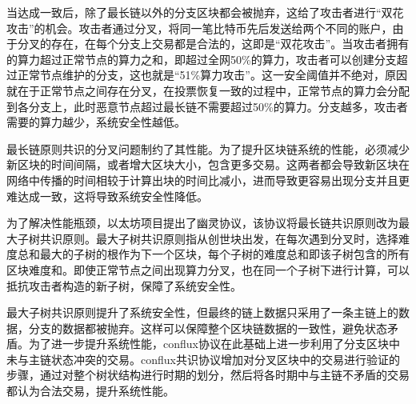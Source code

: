 当达成一致后，除了最长链以外的分支区块都会被抛弃，这给了攻击者进行“双花攻击”的机会。攻击者通过分叉，将同一笔比特币先后发送给两个不同的账户，由于分叉的存在，在每个分支上交易都是合法的，这即是“双花攻击”。当攻击者拥有的算力超过正常节点的算力之和，即超过全网50\%的算力，攻击者可以创建分支超过正常节点维护的分支，这也就是“51\%算力攻击”。这一安全阈值并不绝对，原因就在于正常节点之间存在分叉，在投票恢复一致的过程中，正常节点的算力会分配到各分支上，此时恶意节点超过最长链不需要超过50\%的算力。分支越多，攻击者需要的算力越少，系统安全性越低。

最长链原则共识的分叉问题制约了其性能。为了提升区块链系统的性能，必须减少新区块的时间间隔，或者增大区块大小，包含更多交易。这两者都会导致新区块在网络中传播的时间相较于计算出块的时间比减小，进而导致更容易出现分支并且更难达成一致，这将导致系统安全性降低。

为了解决性能瓶颈，以太坊项目提出了幽灵协议，该协议将最长链共识原则改为最大子树共识原则。最大子树共识原则指从创世块出发，在每次遇到分叉时，选择难度总和最大的子树的根作为下一个区块，每个子树的难度总和即该子树包含的所有区块难度和。即使正常节点之间出现算力分叉，也在同一个子树下进行计算，可以抵抗攻击者构造的新子树，保障了系统安全性。

最大子树共识原则提升了系统安全性，但最终的链上数据只采用了一条主链上的数据，分支的数据都被抛弃。这样可以保障整个区块链数据的一致性，避免状态矛盾。为了进一步提升系统性能，conflux协议在此基础上进一步利用了分支区块中未与主链状态冲突的交易。conflux共识协议增加对分叉区块中的交易进行验证的步骤，通过对整个树状结构进行时期的划分，然后将各时期中与主链不矛盾的交易都认为合法交易，提升系统性能。

